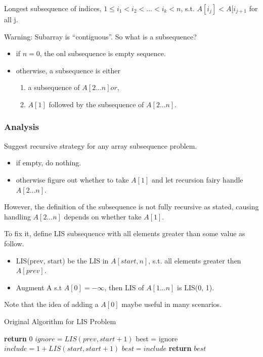 \AlgoOutput Longest subsequence of indices, $1 \leq i_1 < i_2 < ... < i_k < n$, s.t. $A[i_j] < A[i_{j+1}$ for all j.

Warning: Subarray is ``contiguous''. So what is a subsequence?
\begin{itemize}
    \item if $n=0$, the onl subsequence is empty sequence.
    \item otherwise, a subsequence is either
    \begin{enumerate}
        \item a subsequence of $A[2...n] or$,
        \item $A[1]$ followed by the subsequence of $A[2...n]$.
    \end{enumerate}
\end{itemize}

\subsubsection{Analysis}
Suggest recursive strategy for any array subsequence problem.
\begin{itemize}
    \item if empty, do nothing.
    \item otherwise figure out whether to take $A[1]$ and let recursion fairy handle $A[2...n]$.
\end{itemize}

However, the definition of the subsequence is not fully recursive as stated, causing handling $A[2...n]$ depends on whether take $A[1]$.

To fix it, define LIS subsequence with all elements greater than some value as follow.

\begin{itemize}
    \item LIS(prev, start) be the LIS in $A[start, n]$, s.t. all elements greater then $A[prev]$.
    \item Augment A s.t $A[0] = -\infty$, then LIS of $A[1...n]$ is LIS(0, 1).
\end{itemize}

Note that the idea of adding a $A[0]$ maybe useful in many scenarios.

\begin{algorithm}[H]
\caption{Original Algorithm for LIS Problem}\label{ori_lis_alg}
\begin{algorithmic}[1]
 
    \State \textbf{return} {$0$}
\EndIf
\State $ignore = LIS(prev, start +1)$
\State best = ignore
    \State $include = 1 + LIS(start, start+1)$
        \State $best = include$
    \EndIf
\EndIf
\State \textbf{return} {$best$}
\EndProcedure
\end{algorithmic}
\end{algorithm}

